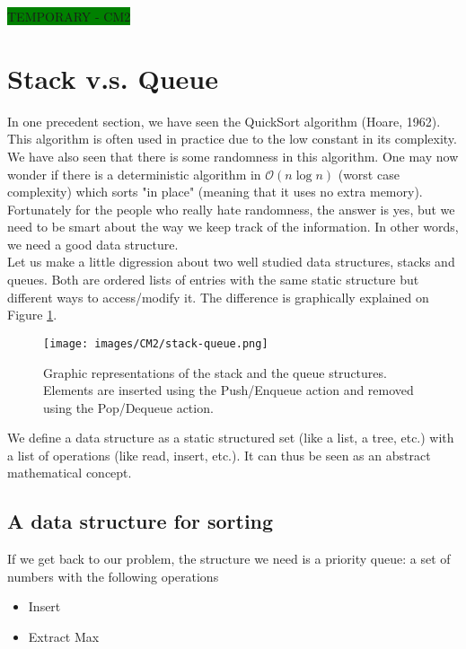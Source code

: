 \colorbox{green}{TEMPORARY - CM2}

\section{Stack v.s. Queue}

In one precedent section, we have seen the QuickSort algorithm (Hoare, 1962). This algorithm is often used in practice due to the low constant in its complexity. We have also seen that there is some randomness in this algorithm. One may now wonder if there is a deterministic algorithm in $\mathcal{O}(n\log n)$ (worst case complexity) which sorts "in place" (meaning that it uses no extra memory).\\ 

Fortunately for the people who really hate randomness, the answer is yes, but we need to be smart about the way we keep track of the information. In other words, we need a good data structure.\\

Let us make a little digression about two well studied data structures, stacks and queues. Both are ordered lists of entries with the same static structure but different ways to access/modify it. The difference is graphically explained on Figure \ref{stackandqueue}.

\begin{figure}[!h]
	\centering
 	\texttt{[image: images/CM2/stack-queue.png]}
  	\caption{Graphic representations of the stack and the queue structures. Elements are inserted using the Push/Enqueue action and removed using the Pop/Dequeue action.}
   	\label{stackandqueue}
\end{figure}

We define a data structure as a static structured set (like a list, a tree, etc.) with a list of operations (like read, insert, etc.). It can thus be seen as an abstract mathematical concept. 

\subsection{A data structure for sorting}

If we get back to our problem, the structure we need is a priority queue: a set of numbers with the following operations
\begin{itemize}
\item Insert
\item Extract Max
\end{itemize}

